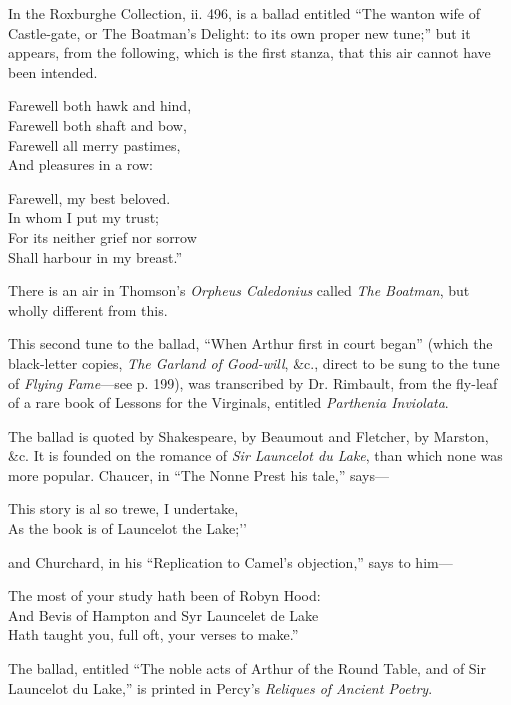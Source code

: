 In the Roxburghe Collection, ii. 496, \pagebreak is a ballad entitled “The wanton wife of
Castle-gate, or The Boatman’s Delight: to its own proper new tune;” but it
appears, from the following, which is the first stanza, that this air cannot have
been intended.
\settowidth{\versewidth}{For its neither grief nor sorrow}
\begin{dcverse}
\begin{altverse}
Farewell both hawk and hind,\\
Farewell both shaft and bow,\\
Farewell all merry pastimes,\\
And pleasures in a row:
\end{altverse}

\begin{altverse}
Farewell, my best beloved.\\
In whom I put my trust;\\
For its neither grief nor sorrow\\
Shall harbour in my breast.”
\end{altverse}
\end{dcverse}

There is an air in Thomson’s \textit{Orpheus Caledonius} called \textit{The Boatman}, but wholly
different from this.





This second tune to the ballad, “When Arthur first in court began” (which
the black-letter copies, \textit{The Garland of Good-will}, \&c., direct to be sung to the
tune of \textit{Flying Fame}—see p. 199), was transcribed by Dr. Rimbault, from the fly-leaf
of a rare book of Lessons for the Virginals, entitled \textit{Parthenia Inviolata}.

The ballad is quoted by Shakespeare, by Beaumout and Fletcher, by Marston,
\&c. It is founded on the romance of \textit{Sir Launcelot du Lake}, than which none
was more popular. Chaucer, in “The Nonne Prest his tale,” says—
\settowidth{\versewidth}{As the book is of Launcelot the Lake; ’’}
\begin{scverse}
This story is al so trewe, I undertake,\\
As the book is of Launcelot the Lake;’’
\end{scverse}
\pagebreak
and Churchard, in his “Replication to Camel’s objection,” says to him—
\small %
\settowidth{\versewidth}{The most of your study hath been of Robyn Hood}
\begin{scverse}The most of your study hath been of Robyn Hood:\\
And Bevis of Hampton and Syr Launcelet de Lake\\
Hath taught you, full oft, your verses to make.”
\end{scverse}
The ballad, entitled “The noble acts of Arthur of the Round Table, and of Sir
Launcelot du Lake,” is printed in Percy’s \textit{Reliques of Ancient Poetry}.

